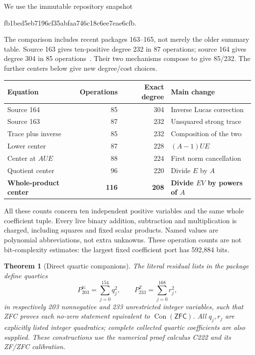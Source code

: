 \documentclass[11pt]{article}
\newtheorem{theorem}{Theorem}[section]
\theoremstyle{remark}\newtheorem{remark}[theorem]{Remark}
\newcommand{\Z}{\mathbb Z}\newcommand{\N}{\mathbb N}
\newcommand{\Con}{\operatorname{Con}}
\newcommand{\ZFC}{\mathsf{ZFC}}\newcommand{\ZF}{\mathsf{ZF}}
\newcommand{\PrimaryOps}{116}
\begin{document}
We use the immutable repository snapshot
\begin{center}\small\ttfamily
fb1bed5eb7196cf35abfaa746c18c6ee7eae6cfb.
\end{center}
The comparison includes recent packages 163--165, not merely the older
summary table. Source 163 gives ten-positive degree 232 in 87 operations;
source 164 gives degree 304 in 85 operations~\cite{p163,p164}. Their two mechanisms compose
to give 85/232. The further centers below give new degree/cost choices.
\begin{center}
\begin{tabular}{lrrl}
\toprule
Equation & Operations & Exact degree & Main change\\
\midrule
Source 164 &85&304&Inverse Lucas correction\\
Source 163 &87&232&Unsquared strong trace\\
Trace plus inverse &85&232&Composition of the two\\
Lower center &87&228&$(A-1)UE$\\
Center at $AUE$ &88&224&First norm cancellation\\
Quotient center &96&220&Divide $E$ by $A$\\
\textbf{Whole-product center} &\textbf{\PrimaryOps}&\textbf{208}&\textbf{Divide $EV$ by powers of $A$}\\
\bottomrule
\end{tabular}
\end{center}
All these counts concern ten independent positive variables and the same
whole coefficient tuple. Every live binary addition, subtraction and
multiplication is charged, including squares and fixed scalar products.
Named values are polynomial abbreviations, not extra unknowns. These
operation counts are not bit-complexity estimates: the largest fixed
coefficient port has 592,884 bits.

\begin{theorem}[Direct quartic companions]\label{thm:direct}
The literal residual lists in the package define quartics
\[
 P_{203}^{\N}=\sum_{j=0}^{154}q_j^2,
 \qquad P_{233}^{\Z}=\sum_{j=0}^{168}r_j^2,
\]
in respectively 203 nonnegative and 233 unrestricted integer variables,
such that ZFC proves each no-zero statement equivalent to $\Con(\ZFC)$.
All $q_j,r_j$ are explicitly listed integer quadratics; complete collected
quartic coefficients are also supplied. These constructions use the
numerical proof calculus C222 and its ZF/ZFC calibration.
\end{theorem}
\end{document}
